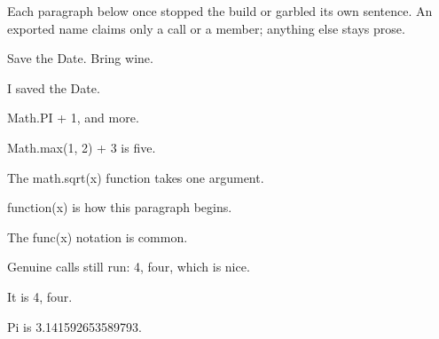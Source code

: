Each paragraph below once stopped the build or garbled its own sentence. An
exported name claims only a call or a member; anything else stays prose.

Save the Date. Bring wine.

I saved the Date.

Math.PI + 1, and more.

Math.max(1, 2) + 3 is five.

The math.sqrt(x) function takes one argument.

function(x) is how this paragraph begins.

The func(x) notation is common.

Genuine calls still run: 4, four, which is nice.

It is 4, four.

Pi is 3.141592653589793.


